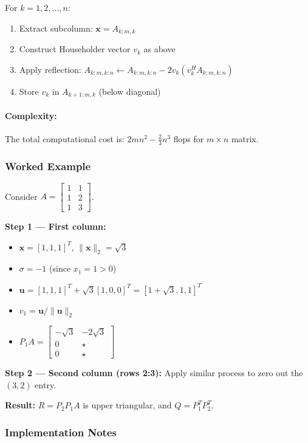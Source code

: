 \documentclass[../../main.tex]{subfiles}
\begin{document}
For $k = 1, 2, \ldots, n$:
\begin{enumerate}
    \item Extract subcolumn: $\mathbf{x} = A_{k:m,k}$
    \item Construct Householder vector $v_k$ as above
    \item Apply reflection: $A_{k:m,k:n} \leftarrow A_{k:m,k:n} - 2v_k(v_k^H A_{k:m,k:n})$
    \item Store $v_k$ in $A_{k+1:m,k}$ (below diagonal)
\end{enumerate}

\paragraph{Complexity:}
The total computational cost is: $2mn^2 - \frac{2}{3}n^3$ flops for $m \times n$ matrix.

\subsubsection{Worked Example}

Consider $A = \begin{bmatrix} 1 & 1 \\ 1 & 2 \\ 1 & 3 \end{bmatrix}$.

\textbf{Step 1 — First column:}
\begin{itemize}
    \item $\mathbf{x} = [1, 1, 1]^T$, $\|\mathbf{x}\|_2 = \sqrt{3}$
    \item $\sigma = -1$ (since $x_1 = 1 > 0$)
    \item $\mathbf{u} = [1, 1, 1]^T + \sqrt{3}[1, 0, 0]^T = [1+\sqrt{3}, 1, 1]^T$
    \item $v_1 = \mathbf{u}/\|\mathbf{u}\|_2$
    \item $P_1 A = \begin{bmatrix} -\sqrt{3} & -2\sqrt{3} \\ 0 & \star \\ 0 & \star \end{bmatrix}$
\end{itemize}

\textbf{Step 2 — Second column (rows 2:3):}
Apply similar process to zero out the $(3,2)$ entry.

\textbf{Result:} $R = P_2 P_1 A$ is upper triangular, and $Q = P_1^T P_2^T$.

\subsubsection{Implementation Notes}
\end{document}

